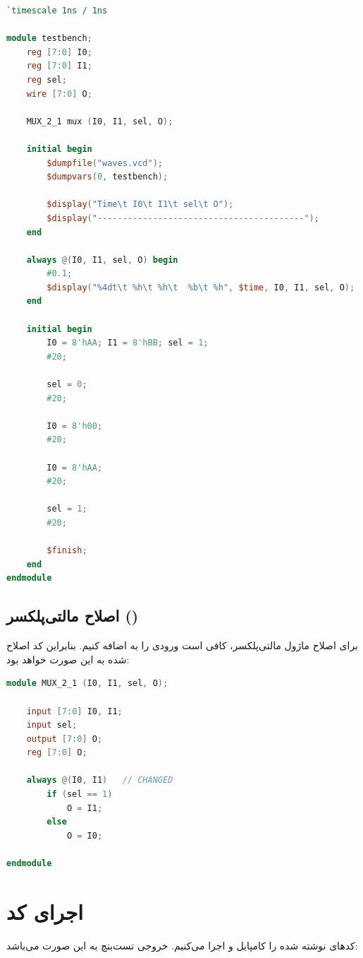 \begin{latin}
    \begin{lstlisting}[language=Verilog]
`timescale 1ns / 1ns

module testbench;
    reg [7:0] I0;
    reg [7:0] I1;
    reg sel;
    wire [7:0] O;

    MUX_2_1 mux (I0, I1, sel, O);

    initial begin
        $dumpfile("waves.vcd");
        $dumpvars(0, testbench);

        $display("Time\t I0\t I1\t sel\t O");
        $display("-----------------------------------------");
    end

    always @(I0, I1, sel, O) begin
        #0.1; 
        $display("%4dt\t %h\t %h\t  %b\t %h", $time, I0, I1, sel, O);
    end

    initial begin
        I0 = 8'hAA; I1 = 8'hBB; sel = 1;
        #20;

        sel = 0;
        #20;

        I0 = 8'h00;
        #20;
        
        I0 = 8'hAA;
        #20;

        sel = 1;
        #20;

        $finish;
    end
endmodule
\end{lstlisting}
\end{latin}

\subsection{اصلاح مالتی‌پلکسر ()}
برای اصلاح ماژول مالتی‌پلکسر، کافی است ورودی  را به  اضافه کنیم. بنابراین کد اصلاح شده به این صورت خواهد بود:

\begin{latin}
    \begin{lstlisting}[language=Verilog]
module MUX_2_1 (I0, I1, sel, O);

    input [7:0] I0, I1;
    input sel;
    output [7:0] O;
    reg [7:0] O;

    always @(I0, I1)   // CHANGED
        if (sel == 1)
            O = I1;
        else
            O = I0;

endmodule
\end{lstlisting}
\end{latin}

\section{اجرای کد}
کدهای نوشته شده را کامپایل و اجرا می‌کنیم. خروجی تست‌بنچ به این صورت می‌باشد:

